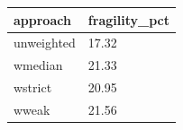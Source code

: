 \begin{tabular}{ll}
\toprule
approach & fragility\_pct \\
\midrule
unweighted & 17.32 \\
wmedian & 21.33 \\
wstrict & 20.95 \\
wweak & 21.56 \\
\bottomrule
\end{tabular}
